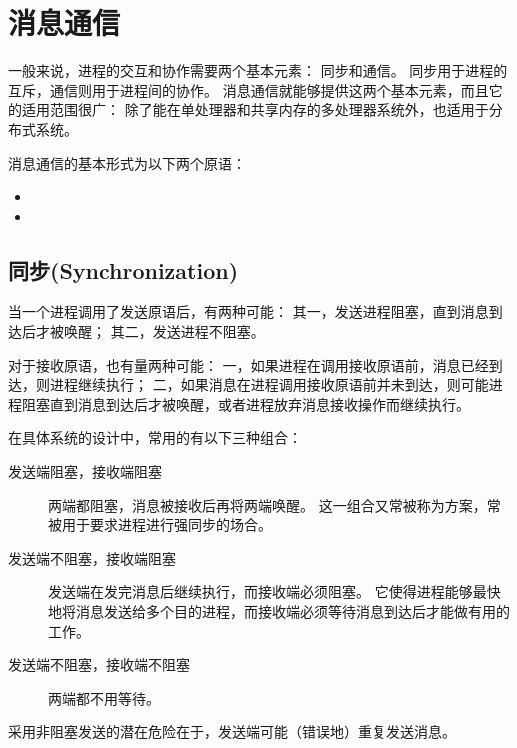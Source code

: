 
\section{消息通信}
{
    一般来说，进程的交互和协作需要两个基本元素：
    同步和通信。
    同步用于进程的互斥，通信则用于进程间的协作。
    消息通信就能够提供这两个基本元素，而且它的适用范围很广：
    除了能在单处理器和共享内存的多处理器系统外，也适用于分布式系统。

    消息通信的基本形式为以下两个原语：

    \begin{itemize}
        \item {}
        \item {}
    \end{itemize}

    \subsection{同步(Synchronization)}
    {
        当一个进程调用了发送原语后，有两种可能：
        其一，发送进程阻塞，直到消息到达后才被唤醒；
        其二，发送进程不阻塞。

        对于接收原语，也有量两种可能：
        一，如果进程在调用接收原语前，消息已经到达，则进程继续执行；
        二，如果消息在进程调用接收原语前并未到达，则可能进程阻塞直到消息到达后才被唤醒，或者进程放弃消息接收操作而继续执行。

        在具体系统的设计中，常用的有以下三种组合：

        \begin{description}
            \item[发送端阻塞，接收端阻塞]
            {
                两端都阻塞，消息被接收后再将两端唤醒。
                这一组合又常被称为方案，常被用于要求进程进行强同步的场合。
            }
            \item[发送端不阻塞，接收端阻塞]
            {
                发送端在发完消息后继续执行，而接收端必须阻塞。
                它使得进程能够最快地将消息发送给多个目的进程，而接收端必须等待消息到达后才能做有用的工作。
            }
            \item[发送端不阻塞，接收端不阻塞] 两端都不用等待。
        \end{description}

        采用非阻塞发送的潜在危险在于，发送端可能（错误地）重复发送消息。
    }

}
